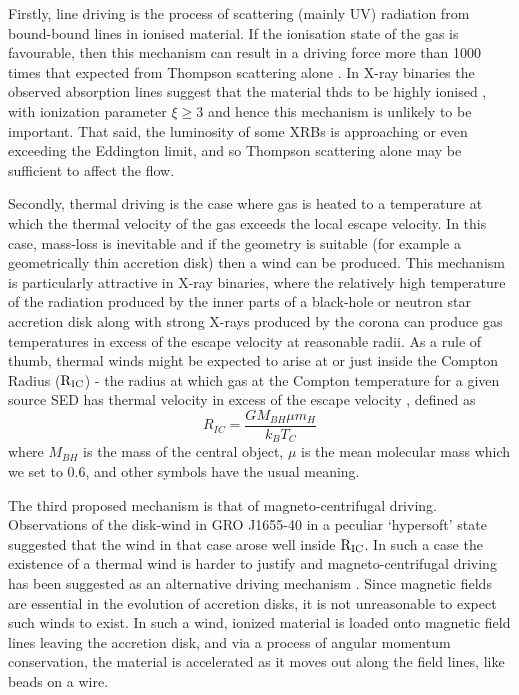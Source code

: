 \documentclass[a4paper,fleqn,usenatbib]{mnras}
\begin{document}
Firstly, line driving is the process of scattering (mainly UV) radiation
from bound-bound lines in ionised material. If the ionisation state of the gas is 
favourable, then this mechanism can
result in a driving force more than  1000 times that expected from Thompson scattering alone \citep{1975ApJ...195..157C}.
 In X-ray binaries
the observed absorption lines suggest that the material thds to be highly ionised \citep[e.g.][]{2009ApJ...701..865K,
2018ApJ...861...26A}, with ionization parameter $\xi \geq 3$
\citep{2016AN....337..368D} and hence this mechanism is unlikely to be important. That said, the luminosity of 
some XRBs is 
approaching or even exceeding the Eddington limit, and so Thompson scattering alone may be sufficient to affect the
flow.

Secondly, thermal driving is the case where gas is heated to a temperature at which the thermal velocity of the 
gas exceeds
the local escape velocity. In this case, mass-loss is inevitable and if the geometry is suitable (for example a
geometrically thin accretion disk) then a wind can be produced. This mechanism is particularly attractive in 
X-ray binaries, where the relatively high temperature of the radiation produced by the inner parts of a black-hole or 
neutron star accretion disk along with strong X-rays produced by the corona can produce gas temperatures in excess
of the escape velocity at reasonable radii. As a rule of thumb, thermal winds might be expected
to arise at or just inside the Compton Radius ($\rm{R_{IC}}$) - the radius at which gas at the Compton temperature
for a given source SED has thermal velocity in excess of the escape velocity \citep{1983ApJ...271...70B}, defined as
\begin{equation}
R_{IC}=\frac{GM_{BH}\mu m_H}{k_BT_C}
\end{equation}
where $M_{BH}$ is the mass of the central object, $\mu$ is the 
mean molecular mass which we set to 0.6, and other symbols have the usual meaning. 



 
The third proposed mechanism is that of magneto-centrifugal driving. 
Observations of the disk-wind in GRO J1655-40 in a peculiar `hypersoft' state suggested that the wind in that
case arose well inside $\rm{R_{IC}}$. In such a case the existence of a thermal wind is harder to justify 
and magneto-centrifugal driving has been suggested as an alternative driving mechanism
\citep[but also see \citealt{2006ApJ...652L.117N,2015MNRAS.451..475U,2016ApJ...823..159S}]
{1992ApJS...80..753S,2006Natur.441..953M,2008ApJ...680.1359M,2009ApJ...701..865K}. Since
magnetic fields are essential in the evolution of accretion disks, it is not unreasonable to expect such winds to 
exist. In such a wind, ionized material is loaded onto magnetic field lines leaving the accretion disk, and via a process
of angular momentum conservation, the material is accelerated as it moves out along the field lines, like beads
on a wire.
\end{document}
